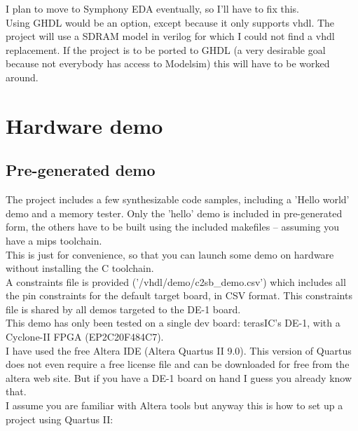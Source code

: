 \documentclass[11pt]{article}
\begin{document}
    I plan to move to Symphony EDA eventually, so I'll have to fix this.\\
    
    Using GHDL would be an option, except because it only supports vhdl. The
    project will use a SDRAM model in verilog for which I could not find a
    vhdl replacement. If the project is to be ported to GHDL (a very desirable 
    goal because not everybody has access to Modelsim) this will have to be 
    worked around.\\

    
\section{Hardware demo}
\label{hw_demo}

\subsection{Pre-generated demo}
\label{pregenerated_demo}

    The project includes a few synthesizable code samples, including a 
    'Hello world' demo and a memory tester. Only the 'hello' demo is included 
    in pre-generated form, the others have to be built using the included 
    makefiles -- assuming you have a mips toolchain.\\

    This is just for convenience, so that you can launch some demo on hardware
    without installing the C toolchain.\\
    
    A constraints file is provided ('/vhdl/demo/c2sb\_demo.csv') which includes
    all the pin constraints for the default target board, in CSV format. This
    constraints file is shared by all demos targeted to the DE-1 board.\\

    This demo has only been tested on a single dev board: terasIC's DE-1,
    with a Cyclone-II FPGA (EP2C20F484C7).\\

    I have used the free Altera IDE (Altera Quartus II 9.0). This version of
    Quartus does not even require a free license file and can be downloaded for
    free from the altera web site. But if you have a DE-1 board on hand I guess
    you already know that.\\

    I assume you are familiar with Altera tools but anyway this is how to set up
    a project using Quartus II:
\end{document}
